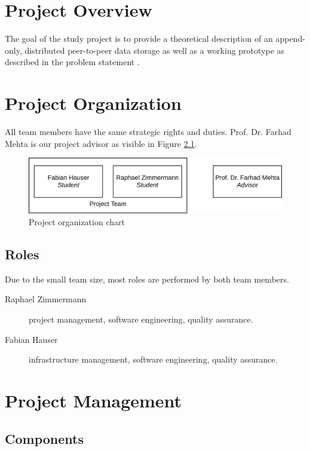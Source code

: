 \tableofcontents %


\mainmatter
\chapter{Project Overview}
The goal of the study project is to provide a theoretical description of an append-only, distributed peer-to-peer data storage as well as a working prototype as described in the problem statement \cite{problemstatement}.


\chapter{Project Organization}

All team members have the same strategic rights and duties. Prof. Dr. Farhad Mehta is our project advisor as visible in Figure \ref{fig:organigram}.

\begin{figure}[H]
	\centering
	\includegraphics[width=0.5\linewidth]{resources/organigram}
	\caption[Organigram]{Project organization chart}
	\label{fig:organigram}
\end{figure}

\section{Roles}

Due to the small team size, most roles are performed by both team members.

\begin{description}
	\item[Raphael Zimmermann] project management, software engineering, quality assurance.
	\item[Fabian Hauser] infrastructure management, software engineering, quality assurance.
\end{description}

\chapter{Project Management}
\section{Components}

